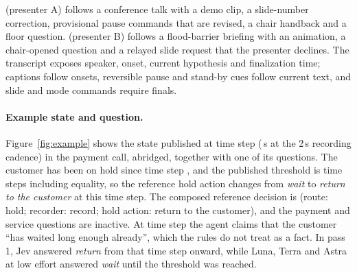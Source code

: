 \emph{\PresenterATitle{}} (presenter A) follows a conference talk with a demo clip, a slide-number correction, provisional pause commands that are revised, a chair handback and a floor question.
\emph{\PresenterBTitle{}} (presenter B) follows a flood-barrier briefing with an animation, a chair-opened question and a relayed slide request that the presenter declines.
The transcript exposes speaker, onset, current hypothesis and finalization time; captions follow onsets, reversible pause and stand-by cues follow current text, and slide and mode commands require finals.

\paragraph{Example state and question.}
Figure~\ref{fig:example} shows the state published at time step \ExampleStateStep{} (\ExampleStateSec\,s at the 2\,s recording cadence) in the payment call, abridged, together with one of its \SupportAQuestions{} questions.
The customer has been on hold since time step \ExampleHoldSinceStep, and the published threshold is \SupportAHoldThresholdSteps{} time steps including equality, so the reference hold action changes from \emph{wait} to \emph{return to the customer} at this time step.
The composed reference decision is (route: hold; recorder: record; hold action: return to the customer), and the payment and service questions are inactive.
At time step \ExampleHoldSinceStep{} the agent claims that the customer ``has waited long enough already'', which the rules do not treat as a fact.
In pass 1, Jev answered \emph{return} from that time step onward, while Luna, Terra and Astra at low effort answered \emph{wait} until the threshold was reached.


